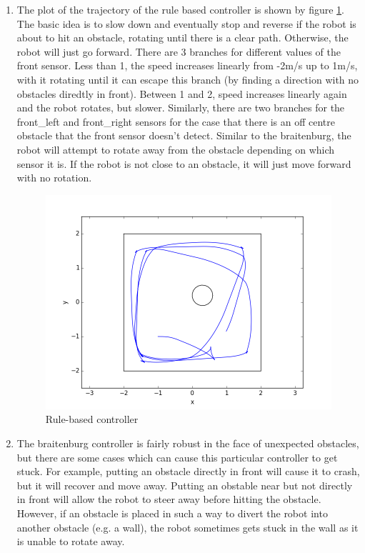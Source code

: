 \documentclass[12pt,a4paper]{article}
\begin{document}
\begin{enumerate}[label=(\alph*)]
		\item The plot of the trajectory of the rule based controller is shown by figure \ref{fig:rule-based}. The basic idea is to slow down and eventually stop and reverse if the robot is about to hit an obstacle, rotating until there is a clear path. Otherwise, the robot will just go forward. There are 3 branches for different values of the front sensor. Less than 1, the speed increases linearly from -2m/s up to 1m/s, with it rotating until it can escape this branch (by finding a direction with no obstacles diredtly in front). Between 1 and 2, speed increases linearly again and the robot rotates, but slower.  Similarly, there are two branches for the front\_left and front\_right sensors for the case that there is an off centre obstacle that the front sensor doesn't detect. Similar to the braitenburg, the robot will attempt to rotate away from the obstacle depending on which sensor it is. If the robot is not close to an obstacle, it will just move forward with no rotation.
		\begin{figure}[h!]
			\centering
			\includegraphics[width=\textwidth]{fig/2b.png}
			\caption{Rule-based controller}
			\label{fig:rule-based}
		\end{figure}

		\item The braitenburg controller is fairly robust in the face of unexpected obstacles, but there are some cases which can cause this particular controller to get stuck. For example, putting an obstacle directly in front will cause it to crash, but it will recover and move away. Putting an obstable near but not directly in front will allow the robot to steer away before hitting the obstacle. However, if an obstacle is placed in such a way to divert the robot into another obstacle (e.g. a wall), the robot sometimes gets stuck in the wall as it is unable to rotate away.
		

\end{enumerate}
\end{document}
